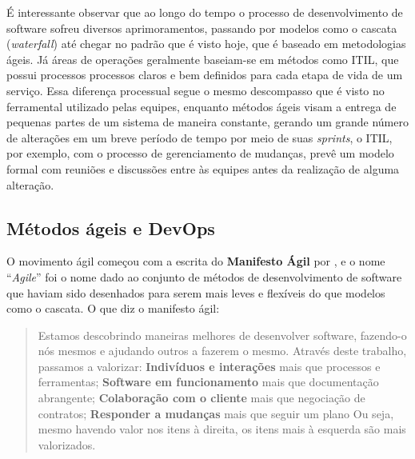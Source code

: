 \documentclass[twoside,english,brazilian]{UNISINOSartigo}
\begin{document}
É interessante observar que ao longo do tempo o processo de desenvolvimento de software sofreu diversos aprimoramentos, passando por modelos como o cascata (\textit{waterfall}) até chegar no padrão que é visto hoje, que é baseado em metodologias ágeis. Já áreas de operações geralmente baseiam-se em métodos como ITIL, que possui processos processos claros e bem definidos para cada etapa de vida de um serviço. Essa diferença processual segue o mesmo descompasso que é visto no ferramental utilizado pelas equipes, enquanto métodos ágeis visam a entrega de pequenas partes de um sistema de maneira constante, gerando um grande número de alterações em um breve período de tempo por meio de suas \textit{sprints}, o ITIL, por exemplo, com o processo de gerenciamento de mudanças, prevê um modelo formal com reuniões e discussões entre às equipes antes da realização de alguma alteração. 

\subsection{Métodos ágeis e DevOps}
O movimento ágil começou com a escrita do \textbf{Manifesto Ágil} por , e o nome ``\textit{Agile}'' foi o nome dado ao conjunto de métodos de desenvolvimento de software que haviam sido desenhados para serem mais leves e flexíveis do que modelos como o cascata.
O que diz o manifesto ágil:  \newline

\begin{quote}
Estamos descobrindo maneiras melhores de desenvolver 
software, fazendo-o nós mesmos e ajudando outros a 
fazerem o mesmo. Através deste trabalho, passamos a valorizar: \textbf{Indivíduos e interações} mais que processos e ferramentas; \textbf{Software em funcionamento} mais que documentação abrangente; \textbf{Colaboração com o cliente} mais que negociação de contratos; \textbf{Responder a mudanças} mais que seguir um plano
Ou seja, mesmo havendo valor nos itens à direita, os itens mais à esquerda são mais valorizados.
\end{quote}
\end{document}
